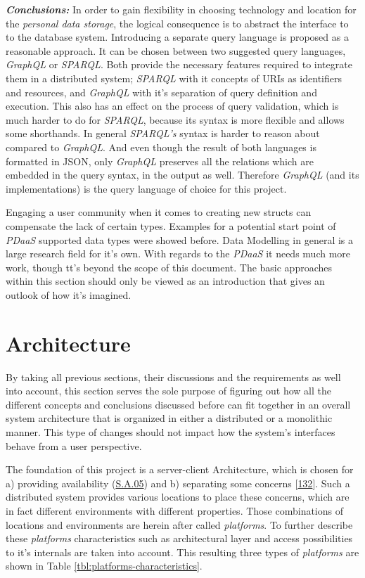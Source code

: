 \documentclass[12pt,english,a4paper,titlepage,cleardoublepage=empty,dottedtoc]{report}
\begin{document}
\emph{\textbf{Conclusions:}} In order to gain flexibility in choosing
technology and location for the \emph{personal data storage}, the
logical consequence is to abstract the interface to to the database
system. Introducing a separate query language is proposed as a
reasonable approach. It can be chosen between two suggested query
languages, \emph{GraphQL} or \emph{SPARQL}. Both provide the necessary
features required to integrate them in a distributed system;
\emph{SPARQL} with it concepts of URIs as identifiers and resources, and
\emph{GraphQL} with it's separation of query definition and execution.
This also has an effect on the process of query validation, which is
much harder to do for \emph{SPARQL}, because its syntax is more flexible
and allows some shorthands. In general \emph{SPARQL's} syntax is harder
to reason about compared to \emph{GraphQL}. And even though the result
of both languages is formatted in JSON, only \emph{GraphQL} preserves
all the relations which are embedded in the query syntax, in the output
as well. Therefore \emph{GraphQL} (and its implementations) is the query
language of choice for this project.

Engaging a user community when it comes to creating new structs can
compensate the lack of certain types. Examples for a potential start
point of \emph{PDaaS} supported data types were showed before. Data
Modelling in general is a large research field for it's own. With
regards to the \emph{PDaaS} it needs much more work, though tt's beyond
the scope of this document. The basic approaches within this section
should only be viewed as an introduction that gives an outlook of how
it's imagined.

\section{Architecture}\label{architecture}

By taking all previous sections, their discussions and the requirements
as well into account, this section serves the sole purpose of figuring
out how all the different concepts and conclusions discussed before can
fit together in an overall system architecture that is organized in
either a distributed or a monolithic manner. This type of changes should
not impact how the system's interfaces behave from a user perspective.

The foundation of this project is a server-client Architecture, which is
chosen for a) providing availability (\protect\hyperlink{sa05}{S.A.05})
and b) separating some concerns
{[}\protect\hyperlink{ref-web_2016_wikipedia_separation-of-concerns}{132}{]}.
Such a distributed system provides various locations to place these
concerns, which are in fact different environments with different
properties. Those combinations of locations and environments are herein
after called \emph{platforms}. To further describe these
\emph{platforms} characteristics such as architectural layer and access
possibilities to it's internals are taken into account. This resulting
three types of \emph{platforms} are shown in Table
\ref{tbl:platforms-characteristics}.
\end{document}

